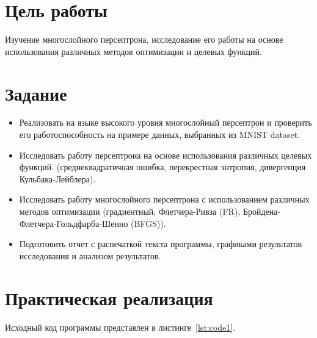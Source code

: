 \documentclass[a4paper, 14pt]{extarticle}
\begin{document}
\renewcommand{\ttdefault}{pcr}

\setlength{\tabcolsep}{3pt}
\newpage
\setcounter{page}{2}

\section{Цель работы}\label{Sect::goal}

Изучение многослойного персептрона, исследование его работы на основе использования различных методов оптимизации и целевых функций.

\section{Задание}\label{Sect::task}

\begin{itemize}
    \item Реализовать на языке высокого уровня многослойный персептрон и проверить его работоспособность на примере данных, выбранных из MNIST dataset.
    \item Исследовать работу персептрона на основе использования различных целевых функций. (среднеквадратичная ошибка, перекрестная энтропия, дивергенция Кульбака-Лейблера).
    \item Исследовать работу многослойного персептрона с использованием различных методов оптимизации (градиентный, Флетчера-Ривза (FR), Бройдена-Флетчера-Гольдфарба-Шенно (BFGS)).
    \item Подготовить отчет с распечаткой текста программы, графиками результатов исследования и анализом результатов.
\end{itemize}

\section{Практическая реализация}\label{Sect::code}

Исходный код программы представлен в листинге~\ref{lst:code1}.
\end{document}

